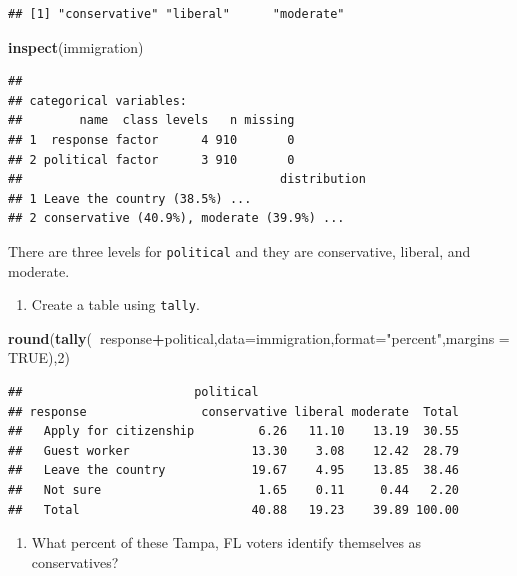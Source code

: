 \documentclass[
]{book}
\newenvironment{Shaded}{\begin{snugshade}}{\end{snugshade}}
\newcommand{\DataTypeTok}[1]{\textcolor[rgb]{0.13,0.29,0.53}{#1}}
\newcommand{\DecValTok}[1]{\textcolor[rgb]{0.00,0.00,0.81}{#1}}
\newcommand{\KeywordTok}[1]{\textcolor[rgb]{0.13,0.29,0.53}{\textbf{#1}}}
\newcommand{\NormalTok}[1]{#1}
\newcommand{\OperatorTok}[1]{\textcolor[rgb]{0.81,0.36,0.00}{\textbf{#1}}}
\newcommand{\OtherTok}[1]{\textcolor[rgb]{0.56,0.35,0.01}{#1}}
\newcommand{\StringTok}[1]{\textcolor[rgb]{0.31,0.60,0.02}{#1}}
\providecommand{\tightlist}{%
  \setlength{\itemsep}{0pt}\setlength{\parskip}{0pt}}
\begin{document}
\begin{verbatim}
## [1] "conservative" "liberal"      "moderate"
\end{verbatim}

\begin{Shaded}
\begin{Highlighting}[]
\KeywordTok{inspect}\NormalTok{(immigration)}
\end{Highlighting}
\end{Shaded}

\begin{verbatim}
## 
## categorical variables:  
##        name  class levels   n missing
## 1  response factor      4 910       0
## 2 political factor      3 910       0
##                                    distribution
## 1 Leave the country (38.5%) ...                
## 2 conservative (40.9%), moderate (39.9%) ...
\end{verbatim}

There are three levels for \texttt{political} and they are conservative, liberal, and moderate.

\begin{enumerate}
\def\labelenumi{\alph{enumi}.}
\setcounter{enumi}{1}
\tightlist
\item
  Create a table using \texttt{tally}.
\end{enumerate}

\begin{Shaded}
\begin{Highlighting}[]
\KeywordTok{round}\NormalTok{(}\KeywordTok{tally}\NormalTok{(}\OperatorTok{~}\NormalTok{response}\OperatorTok{+}\NormalTok{political,}\DataTypeTok{data=}\NormalTok{immigration,}\DataTypeTok{format=}\StringTok{"percent"}\NormalTok{,}\DataTypeTok{margins =} \OtherTok{TRUE}\NormalTok{),}\DecValTok{2}\NormalTok{)}
\end{Highlighting}
\end{Shaded}

\begin{verbatim}
##                        political
## response                conservative liberal moderate  Total
##   Apply for citizenship         6.26   11.10    13.19  30.55
##   Guest worker                 13.30    3.08    12.42  28.79
##   Leave the country            19.67    4.95    13.85  38.46
##   Not sure                      1.65    0.11     0.44   2.20
##   Total                        40.88   19.23    39.89 100.00
\end{verbatim}

\begin{enumerate}
\def\labelenumi{\alph{enumi}.}
\setcounter{enumi}{2}
\tightlist
\item
  What percent of these Tampa, FL voters identify themselves as conservatives?
\end{enumerate}
\end{document}
